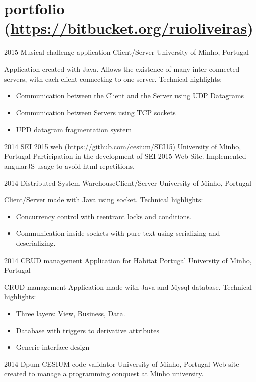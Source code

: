 \documentclass[]{friggeri-cv} %
\begin{document}
\section{portfolio {\normalfont \normalsize (\href{https://bitbucket.org/ruioliveiras}{https://bitbucket.org/ruioliveiras})}}
\begin{entrylist}

\entry
{2015}
{Musical challenge application Client/Server}
{University of Minho, Portugal}
{
    Application created with Java. Allows the existence of many inter-connected servers, with each client connecting to one server. Technical highlights:
\begin{itemize} 
    \item Communication between the Client and the Server using UDP Datagrams
    \item Communication between Servers using TCP sockets
    \item UPD datagram fragmentation system
\end{itemize}
}


\entry
{2014}
{SEI 2015 web  {\normalfont \normalsize (\href{https://github.com/cesium/SEI15}{https://github.com/cesium/SEI15})}}
{University of Minho, Portugal}
{Participation in the development of SEI 2015 Web-Site. Implemented angularJS usage to avoid html repetitions.}

\entry
{2014}
{Distributed System \"Warehouse\" Client/Server }
{University of Minho, Portugal}
{Client/Server made with Java using socket. Technical highlights:
\begin{itemize} 
    \item Concurrency control with reentrant locks and conditions.
    \item Communication inside sockets with pure text using serializing and deserializing.
\end{itemize}
}
\entry
{2014}
{CRUD management Application for Habitat Portugal}
{University of Minho, Portugal}
{CRUD management Application made with Java and Mysql database. Technical highlights:
\begin{itemize} 
    \item Three layers: View, Business, Data.
    \item Database with triggers to derivative attributes
    \item Generic interface design
\end{itemize}
}
\entry
{2014}
{Dpum CESIUM code validator}
{University of Minho, Portugal}
{Web site created to manage a programming conquest at Minho university.}


\end{entrylist}
\end{document}
